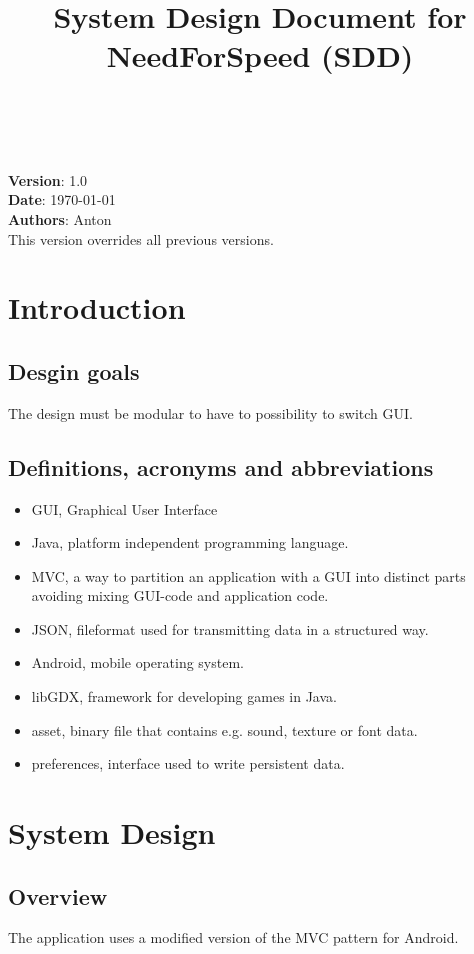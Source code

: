 \documentclass{article}
\begin{document}
\title{System Design Document for NeedForSpeed (SDD)}
\author{}
\date{}
\maketitle

\tableofcontents

\noindent
\\
\\
\textbf{Version}: 1.0 \\
\textbf{Date}: \today \\
\textbf{Authors}: Anton \\
This version overrides all previous versions.

\section{Introduction}
\subsection{Desgin goals}
The design must be modular to have to possibility to switch GUI.

\subsection{Definitions, acronyms and abbreviations}
\begin{itemize}
  \item GUI, Graphical User Interface
  \item Java, platform independent programming language.
  \item MVC, a way to partition an application with a GUI into distinct parts avoiding
  mixing GUI-code and application code.
  \item JSON, fileformat used for transmitting data in a structured way.
  \item Android, mobile operating system. 
  \item libGDX, framework for developing games in Java.
  \item asset, binary file that contains e.g. sound, texture or font data.
  \item preferences, interface used to write persistent data.
\end{itemize}

\section{System Design}
\subsection{Overview}
The application uses a modified version of the MVC pattern for Android.
\end{document}
